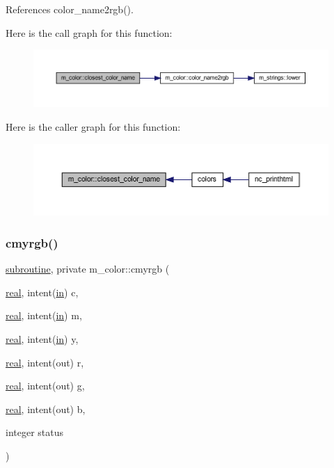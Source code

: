 References color\+\_\+name2rgb().

Here is the call graph for this function\+:
\nopagebreak
\begin{figure}[H]
\begin{center}
\leavevmode
\includegraphics[width=350pt]{namespacem__color_acad72628ee0b77cf87f40cd46734fb18_cgraph}
\end{center}
\end{figure}
Here is the caller graph for this function\+:
\nopagebreak
\begin{figure}[H]
\begin{center}
\leavevmode
\includegraphics[width=350pt]{namespacem__color_acad72628ee0b77cf87f40cd46734fb18_icgraph}
\end{center}
\end{figure}
\mbox{\label{namespacem__color_ab91687e87d0901874e52efe5933e3044}} 
\subsubsection{\texorpdfstring{cmyrgb()}{cmyrgb()}}
{\footnotesize\ttfamily \hyperlink{M__stopwatch_83_8txt_acfbcff50169d691ff02d4a123ed70482}{subroutine}, private m\+\_\+color\+::cmyrgb (\begin{DoxyParamCaption}\item[{\hyperlink{read__watch_83_8txt_abdb62bde002f38ef75f810d3a905a823}{real}, intent(\hyperlink{M__journal_83_8txt_afce72651d1eed785a2132bee863b2f38}{in})}]{c,  }\item[{\hyperlink{read__watch_83_8txt_abdb62bde002f38ef75f810d3a905a823}{real}, intent(\hyperlink{M__journal_83_8txt_afce72651d1eed785a2132bee863b2f38}{in})}]{m,  }\item[{\hyperlink{read__watch_83_8txt_abdb62bde002f38ef75f810d3a905a823}{real}, intent(\hyperlink{M__journal_83_8txt_afce72651d1eed785a2132bee863b2f38}{in})}]{y,  }\item[{\hyperlink{read__watch_83_8txt_abdb62bde002f38ef75f810d3a905a823}{real}, intent(out)}]{r,  }\item[{\hyperlink{read__watch_83_8txt_abdb62bde002f38ef75f810d3a905a823}{real}, intent(out)}]{g,  }\item[{\hyperlink{read__watch_83_8txt_abdb62bde002f38ef75f810d3a905a823}{real}, intent(out)}]{b,  }\item[{integer}]{status }\end{DoxyParamCaption})\hspace{0.3cm}{\ttfamily [private]}}


